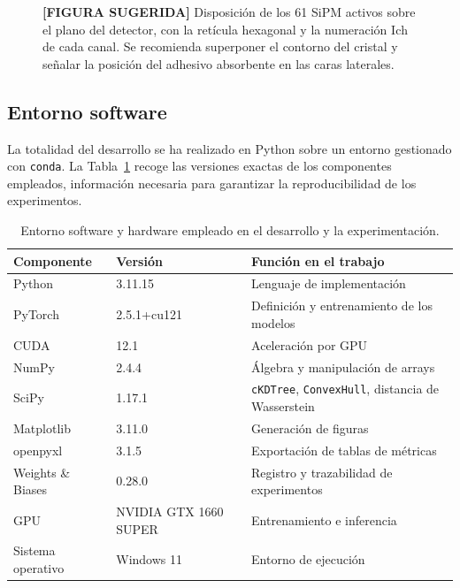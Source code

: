 \begin{figure}[htbp]
\centering
\caption{\textbf{[FIGURA SUGERIDA]} Disposición de los 61 SiPM activos sobre el plano del detector,
con la retícula hexagonal y la numeración $\mathrm{Ich}$ de cada canal. Se recomienda superponer el
contorno del cristal y señalar la posición del adhesivo absorbente en las caras laterales.}
\label{fig:geometria-detector}
\end{figure}

\subsection{Entorno software}
\label{subsec:entorno-software}

La totalidad del desarrollo se ha realizado en Python sobre un entorno gestionado con
\texttt{conda}. La Tabla~\ref{tab:entorno-software} recoge las versiones exactas de los componentes
empleados, información necesaria para garantizar la reproducibilidad de los experimentos.

\begin{table}[htbp]
\centering
\caption{Entorno software y hardware empleado en el desarrollo y la experimentación.}
\label{tab:entorno-software}
\begin{tabular}{lll}
\toprule
\textbf{Componente} & \textbf{Versión} & \textbf{Función en el trabajo} \\
\midrule
Python & 3.11.15 & Lenguaje de implementación \\
PyTorch & 2.5.1+cu121 & Definición y entrenamiento de los modelos \\
CUDA & 12.1 & Aceleración por GPU \\
NumPy & 2.4.4 & Álgebra y manipulación de arrays \\
SciPy & 1.17.1 & \texttt{cKDTree}, \texttt{ConvexHull}, distancia de Wasserstein \\
Matplotlib & 3.11.0 & Generación de figuras \\
openpyxl & 3.1.5 & Exportación de tablas de métricas \\
Weights \& Biases & 0.28.0 & Registro y trazabilidad de experimentos \\
\midrule
GPU & NVIDIA GTX 1660 SUPER & Entrenamiento e inferencia \\
Sistema operativo & Windows 11 & Entorno de ejecución \\
\bottomrule
\end{tabular}
\end{table}

